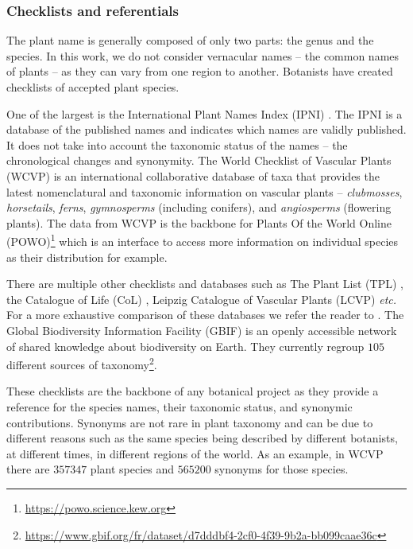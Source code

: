 \subsubsection{Checklists and referentials}

The plant name is generally composed of only two parts: the genus and the species.
In this work, we do not consider vernacular names -- the common names of plants -- as they can vary from one region to another.
Botanists have created checklists of accepted plant species.

One of the largest is the International Plant Names Index (IPNI) \citep{IPNI2024}.
The IPNI is a database of the published names and indicates which names are validly published.
It does not take into account the taxonomic status of the names -- the chronological changes and synonymity.
The World Checklist of Vascular Plants (WCVP) \citep{govaerts2021world} is an international collaborative database of taxa that provides the latest nomenclatural and taxonomic information on vascular plants -- \emph{clubmosses}, \emph{horsetails}, \emph{ferns}, \emph{gymnosperms} (including conifers), and \emph{angiosperms} (flowering plants).
The data from WCVP is the backbone for Plants Of the World Online (POWO)\footnote{\url{https://powo.science.kew.org}} which is an interface to access more information on individual species as their distribution for example.

There are multiple other checklists and databases such as The Plant List (TPL) \citep{PlantList2013}, the Catalogue of Life (CoL) \citep{cachuela2006towards}, Leipzig Catalogue of Vascular Plants (LCVP) \citep{freiberg2020leipzig} \emph{etc.} For a more exhaustive comparison of these databases we refer the reader to \citet{schellenberger2023big}.
The Global Biodiversity Information Facility (GBIF) \citep{telenius2011biodiversity} is an openly accessible network of shared knowledge about biodiversity on Earth.
They currently regroup $105$ different sources of taxonomy\footnote{\url{https://www.gbif.org/fr/dataset/d7dddbf4-2cf0-4f39-9b2a-bb099caae36c}}.

These checklists are the backbone of any botanical project as they provide a reference for the species names, their taxonomic status, and synonymic contributions.
Synonyms are not rare in plant taxonomy and can be due to different reasons such as the same species being described by different botanists, at different times, in different regions of the world.
As an example, in WCVP there are $\num{357347}$ plant species and $\num{565200}$ synonyms for those species.

